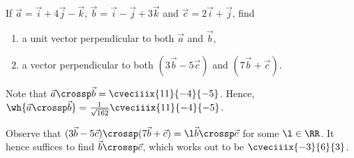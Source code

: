\begin{problem}
    If $\vec a = \vec i + 4 \vec j - \vec k$, $\vec b = \vec i - \vec j + 3 \vec k$ and $\vec c = 2 \vec i + \vec j$, find

    \begin{enumerate}
        \item a unit vector perpendicular to both $\vec a$ and $\vec b$,
        \item a vector perpendicular to both $(3 \vec b - 5 \vec c)$ and $(7 \vec b + \vec c)$.
    \end{enumerate}
\end{problem}
\begin{solution}
    \begin{ppart}
        Note that $\vec a \crossp \vec b = \cveciiix{11}{-4}{-5}$. Hence, $\wh{\vec a \crossp \vec b} = \frac1{\sqrt{162}} \cveciiix{11}{-4}{-5}$.
    \end{ppart}
    \begin{ppart}
        Observe that $(3 \vec b - 5 \vec c) \crossp (7 \vec b + \vec c) = \l \vec b \crossp \vec c$ for some $\l \in \RR$. It hence suffices to find $\vec b \crossp \vec c$, which works out to be $\cveciiix{-3}{6}{3}$.
    \end{ppart}
\end{solution}

